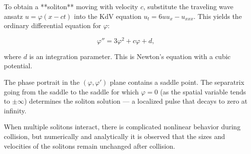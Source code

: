 To obtain a **soliton** moving with velocity $c$, substitute the traveling wave ansatz $u = \varphi(x - ct)$ into the KdV equation $u_t = 6uu_x - u_{xxx}$. This yields the ordinary differential equation for $\varphi$:

$$\varphi'' = 3\varphi^2 + c\varphi + d,$$

where $d$ is an integration parameter. This is Newton's equation with a cubic potential.

The phase portrait in the $(\varphi, \varphi')$ plane contains a saddle point. The separatrix going from the saddle to the saddle for which $\varphi = 0$ (as the spatial variable tends to $\pm\infty$) determines the soliton solution — a localized pulse that decays to zero at infinity.

When multiple solitons interact, there is complicated nonlinear behavior during collision, but numerically and analytically it is observed that the sizes and velocities of the solitons remain unchanged after collision.
